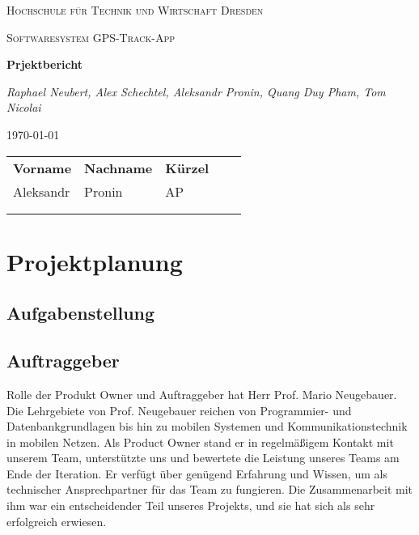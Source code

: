 \documentclass{article}
\begin{document}
\begin{titlepage}
    \centering
    {\scshape\LARGE Hochschule für Technik und Wirtschaft Dresden \par}
    \vspace{1cm}
    {\scshape\Large Softwaresystem \glqq GPS-Track-App\grqq\par}
    \vspace{1.5cm}
    {\huge\bfseries Prjektbericht\par}
    \vspace{2cm}
    {\Large\itshape Raphael Neubert, Alex Schechtel, Aleksandr Pronin, Quang Duy Pham, Tom Nicolai\par}
    \vfill

    {\large \today\par}
\end{titlepage}
\tableofcontents
\newpage
\begin{table}[]
    \begin{tabular}{lllll}
    \textbf{Vorname} & \textbf{Nachname} & \textbf{Kürzel} &  &  \\
    Aleksandr        & Pronin            & AP              &  &  \\
                     &                   &                 &  &  \\
                     &                   &                 &  & 
    \end{tabular}
\end{table}
\section{Projektplanung}
\subsection{Aufgabenstellung}
\subsection{Auftraggeber}
    Rolle der Produkt Owner und Auftraggeber hat Herr Prof. Mario Neugebauer. Die Lehrgebiete von Prof. Neugebauer
    reichen von Programmier- und Datenbankgrundlagen bis hin zu mobilen Systemen und Kommunikationstechnik in 
    mobilen Netzen. Als Product Owner stand er in regelmäßigem Kontakt mit unserem Team, unterstützte uns und
    bewertete die Leistung unseres Teams am Ende der Iteration. Er verfügt über genügend Erfahrung und Wissen,
    um als technischer Ansprechpartner für das Team zu fungieren. Die Zusammenarbeit mit ihm war ein entscheidender Teil 
    unseres Projekts, und sie hat sich als sehr erfolgreich erwiesen.
\end{document}
